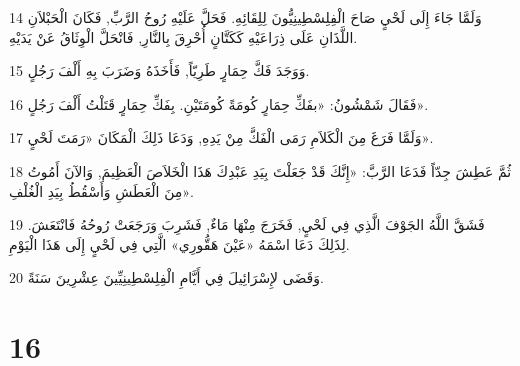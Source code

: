 \par 14 وَلَمَّا جَاءَ إِلَى لَحْيٍ صَاحَ الْفِلِسْطِينِيُّونَ لِلِقَائِهِ. فَحَلَّ عَلَيْهِ رُوحُ الرَّبِّ, فَكَانَ الْحَبْلاَنِ اللَّذَانِ عَلَى ذِرَاعَيْهِ كَكَتَّانٍ أُحْرِقَ بِالنَّارِ, فَانْحَلَّ الْوِثَاقُ عَنْ يَدَيْهِ.
\par 15 وَوَجَدَ فَكَّ حِمَارٍ طَرِيّاً, فَأَخَذَهُ وَضَرَبَ بِهِ أَلْفَ رَجُلٍ.
\par 16 فَقَالَ شَمْشُونُ: «بفَكِّ حِمَارٍ كُومَةً كُومَتَيْنِ. بِفَكِّ حِمَارٍ قَتَلْتُ أَلْفَ رَجُلٍ».
\par 17 وَلَمَّا فَرَغَ مِنَ الْكَلاَمِ رَمَى الْفَكَّ مِنْ يَدِهِ, وَدَعَا ذَلِكَ الْمَكَانَ «رَمَتَ لَحْيٍ».
\par 18 ثُمَّ عَطِشَ جِدّاً فَدَعَا الرَّبَّ: «إِنَّكَ قَدْ جَعَلْتَ بِيَدِ عَبْدِكَ هَذَا الْخَلاَصَ الْعَظِيمَ, وَالآنَ أَمُوتُ مِنَ الْعَطَشِ وَأَسْقُطُ بِيَدِ الْغُلْفِ».
\par 19 فَشَقَّ اللَّهُ الجَوْفَ الَّذِي فِي لَحْيٍ, فَخَرَجَ مِنْهَا مَاءٌ, فَشَرِبَ وَرَجَعَتْ رُوحُهُ فَانْتَعَشَ. لِذَلِكَ دَعَا اسْمَهُ «عَيْنَ هَقُّورِي» الَّتِي فِي لَحْيٍ إِلَى هَذَا الْيَوْمِ.
\par 20 وَقَضَى لإِسْرَائِيلَ فِي أَيَّامِ الْفِلِسْطِينِيِّينَ عِشْرِينَ سَنَةً.

\chapter{16}


